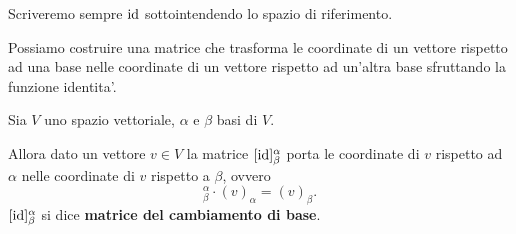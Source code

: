 Scriveremo sempre $\operatorname{id}$ sottointendendo lo spazio di riferimento.

Possiamo costruire una matrice che trasforma le coordinate di un vettore rispetto ad una base nelle coordinate di un vettore rispetto ad un'altra base sfruttando la funzione identita'.

\begin{definition}
    Sia $V$ uno spazio vettoriale, $\alpha$ e $\beta$ basi di $V$. 
    
    Allora dato un vettore $v \in V$ la matrice $[\operatorname{id}]^{\alpha}_{\beta}$ porta le coordinate di $v$ rispetto ad $\alpha$ nelle coordinate di $v$ rispetto a $\beta$, ovvero \begin{equation}
        [\id]^{\alpha}_{\beta} \cdot (v)_{\alpha} = (v)_{\beta}.
    \end{equation}
    $[\operatorname{id}]^{\alpha}_{\beta}$ si dice \textbf{matrice del cambiamento di base}.
\end{definition}

